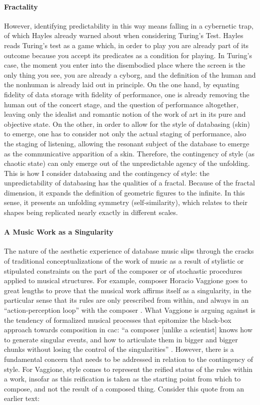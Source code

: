 \paragraph{Fractality}
However, identifying predictability in this way means falling in a cybernetic trap, of which Hayles already warned about when considering Turing's Test. Hayles reads Turing's test as a game which, in order to play you are already part of its outcome because you accept its predicates as a condition for playing. In Turing's case, the moment you enter into the disembodied place where the screen is the only thing you see, you are already a cyborg, and the definition of the human and the nonhuman is already laid out in principle. On the one hand, by equating fidelity of data storage with fidelity of performance, one is already removing the human out of the concert stage, and the question of performance altogether, leaving only the idealist and romantic notion of the work of art in its pure and objective state. On the other, in order to allow for the style of databasing (skin) to emerge, one has to consider not only the actual staging of performance, also the staging of listening, allowing the resonant subject of the database to emerge as the communicative apparition of a skin. Therefore, the contingency of style (as chaotic state) can only emerge out of the unpredictable agency of the unfolding. This is how I consider databasing and the contingency of style: the unpredictability of databasing has the qualities of a fractal. Because of the fractal dimension, it expands the definition of geometric figures to the infinite. In this sense, it presents an unfolding symmetry (self-similarity), which relates to their shapes being replicated nearly exactly in different scales. 

\paragraph{A Music Work as a Singularity}
The nature of the aesthetic experience of database music slips through the cracks of traditional conceptualizations of the work of music as a result of stylistic or stipulated constraints on the part of the composer or of stochastic procedures applied to musical structures. For example, composer Horacio Vaggione goes to great lengths to prove that the musical work affirms itself as a singularity, in the particular sense that its rules are only prescribed from within, and always in an ``action-perception loop'' with the composer \parencite{Vag01:Som}. What Vaggione is arguing against is the tendency of formalized musical processes that epitomize the black-box approach towards composition in \gls{cac}: ``a composer [unlike a scientist] knows how to generate singular events, and how to articulate them in bigger and bigger chunks without losing the control of the singularities'' \parencite[97]{Vag93:Det}. However, there is a fundamental concern that needs to be addressed in relation to the contingency of style. For Vaggione, style comes to represent the reified status of the rules within a work, insofar as this reification is taken as the starting point from which to compose, and not the result of a composed thing. Consider this quote from an earlier text:

